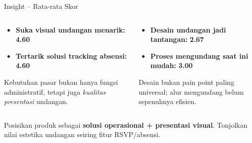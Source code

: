 \documentclass[aspectratio=169]{beamer}
\newcommand{\faStar}{[*]}
\newcommand{\faArrowDown}{[$\downarrow$]}
\newcommand{\faLightbulb}{[?]}
\begin{document}
\begin{frame}{Insight -- Rata-rata Skor}
  \begin{columns}[T]
      \begin{tcolorbox}[insightbox,title={\faStar\quad Skor Tertinggi}]
        \begin{itemize}\small
          \item \textbf{Suka visual undangan menarik:} \textcolor{accent}{\textbf{4.60}}
          \item \textbf{Tertarik solusi tracking absensi:} \textcolor{accent}{\textbf{4.60}}
        \end{itemize}
        \vspace{0.2cm}
        \small Kebutuhan pasar bukan hanya fungsi administratif, tetapi juga \textit{kualitas presentasi} undangan.
      \end{tcolorbox}
      \begin{tcolorbox}[statbox,title={\faArrowDown\quad Skor Terendah}]
        \begin{itemize}\small
          \item \textbf{Desain undangan jadi tantangan:} \textcolor{danger}{\textbf{2.67}}
          \item \textbf{Proses mengundang saat ini mudah:} \textbf{3.00}
        \end{itemize}
        \vspace{0.2cm}
        \small Desain bukan pain point paling universal; alur mengundang belum sepenuhnya efisien.
      \end{tcolorbox}
  \end{columns}
  \vspace{0.3cm}
  \begin{tcolorbox}[implbox,title={\faLightbulb\quad Implikasi Produk}]
    \small Posisikan produk sebagai \textbf{solusi operasional + presentasi visual}.
    Tonjolkan nilai estetika undangan seiring fitur RSVP/absensi.
  \end{tcolorbox}
\end{frame}
\end{document}
